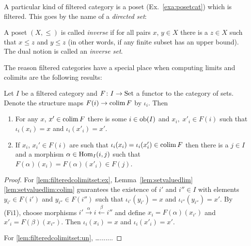 \documentclass[a4paper,openany]{scrbook}
\begin{document}
A particular kind of filtered category is a poset (Ex.~\ref{exa:posetcat}) which is filtered. This goes by the name of a \emph{directed set}:

\begin{defn}
A poset $(X,\leq)$ is called \emph{inverse} if for all pairs $x$, $y \in X$ there is a $z \in X$ such that $x \leq z$ and $y \leq z$ (in other words, if any finite subset has an upper bound). The dual notion is called an \emph{inverse set}.
\end{defn}

The reason filtered categories have a special place when computing limits and colimits are the following results:

\begin{lemma} \label{lem:filteredcolimitset}
Let $I$ be a filtered category and $F\colon I \to \operatorname{Set}$ a functor to the category of sets. Denote the structure maps $F(i) \to \operatorname*{colim} F$ by $\iota_i$. Then
\begin{enumerate}
\item For any $x$, $x' \in \operatorname*{colim} F$ there is some $i \in \operatorname{ob}(I)$ and $x_i,\; x'_i \in F(i)$ such that $\iota_i(x_i)=x$ and $\iota_i(x'_i)=x'$. \label{lem:filteredcolimitset:ex}
\item If $x_i$, $x_i' \in F(i)$ are such that $\iota_i(x_i) = \iota_i(x'_i) \in \operatorname*{colim} F$ then there is a $j \in I$ and a morphism $\alpha \in \operatorname{Hom}_I(i,j)$ such that $F(\alpha)(x_i) = F(\alpha)(x'_i) \in F(j)$. \label{lem:filteredcolimitset:un}
\end{enumerate}
\end{lemma}
\begin{proof}
For \eqref{lem:filteredcolimitset:ex}, Lemma~\ref{lem:setvaluedlim}\eqref{lem:setvaluedlim:colim} guarantees the existence of $i'$ and $i'' \in I$ with elements $y_{i'} \in F(i')$ and $y_{i''} \in F(i'')$ such that $\iota_{i'}(y_{i'}) = x$ and $\iota_{i''}(y_{i''}) = x'$. By (Fi1), choose morphisms $i' \xrightarrow{\alpha} i \xleftarrow{\beta} i''$ and define $x_i = F(\alpha)(x_{i'})$ and $x'_i = F(\beta)(x_{i''})$. Then $\iota_i(x_i)=x$ and $\iota_i(x'_i)=x'$.

For \eqref{lem:filteredcolimitset:un}, \dots.......

\end{proof}
\end{document}
